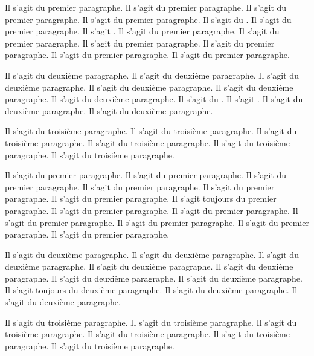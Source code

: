 \documentclass[12pt]{book}
\begin{document}
\Xpstart[A]
\Xpstart[B]

\begin{pages}
\begin{Leftside}
\beginnumbering
\numberpstarttrue
\numberlinetrue

\pstart
Il s'agit du premier paragraphe.
Il s'agit du premier paragraphe.
Il s'agit du premier paragraphe.
Il s'agit du premier paragraphe.
Il s'agit du .
Il s'agit du premier paragraphe.
Il s'agit .
Il s'agit du premier paragraphe.
Il s'agit du premier paragraphe.
Il s'agit du premier paragraphe.
Il s'agit du premier paragraphe.
Il s'agit du premier paragraphe.
Il s'agit du premier paragraphe.
\pend

\pstart
Il s'agit du deuxième paragraphe.
Il s'agit du deuxième paragraphe.
Il s'agit du deuxième paragraphe.
Il s'agit du deuxième paragraphe.
Il s'agit du deuxième paragraphe.
Il s'agit du deuxième paragraphe.
Il s'agit du .
Il s'agit .
Il s'agit du deuxième paragraphe.
Il s'agit du deuxième paragraphe.
\pend

\pstart
Il s'agit du troisième paragraphe.
Il s'agit du troisième paragraphe.
Il s'agit du troisième paragraphe.
Il s'agit du troisième paragraphe.
Il s'agit du troisième paragraphe.
Il s'agit du troisième paragraphe.
\pend

\endnumbering
\end{Leftside}
\begin{Rightside}
\beginnumbering
\numberpstarttrue
\numberlinetrue

\pstart
Il s'agit du premier paragraphe.
Il s'agit du premier paragraphe.
Il s'agit du premier paragraphe.
Il s'agit du premier paragraphe.
Il s'agit du premier paragraphe.
Il s'agit du premier paragraphe.
Il s'agit toujours du premier paragraphe\edtextnow.
Il s'agit du premier paragraphe.
Il s'agit du premier paragraphe.
Il s'agit du premier paragraphe.
Il s'agit du premier paragraphe.
Il s'agit du premier paragraphe.
Il s'agit du premier paragraphe.
\pend

\pstart
Il s'agit du deuxième paragraphe.
Il s'agit du deuxième paragraphe.
Il s'agit du deuxième paragraphe.
Il s'agit du deuxième paragraphe.
Il s'agit du deuxième paragraphe.
Il s'agit du deuxième paragraphe.
Il s'agit du deuxième paragraphe.
Il s'agit toujours du deuxième paragraphe\edtextnow.
Il s'agit du deuxième paragraphe.
Il s'agit du deuxième paragraphe.
\pend

\pstart
Il s'agit du troisième paragraphe.
Il s'agit du troisième paragraphe.
Il s'agit du troisième paragraphe.
Il s'agit du troisième paragraphe.
Il s'agit du troisième paragraphe.
Il s'agit du troisième paragraphe.
\pend

\endnumbering
\end{Rightside}

\end{pages}
\Pages
\end{document}
